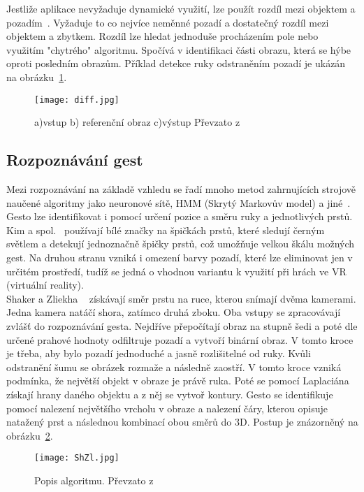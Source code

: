 Jestliže aplikace nevyžaduje dynamické využití, lze použít rozdíl mezi objektem a pozadím~\cite{14}. Vyžaduje to co nejvíce neměnné pozadí a dostatečný rozdíl mezi objektem a zbytkem. Rozdíl lze hledat jednoduše procházením pole nebo využitím "chytrého" algoritmu. Spočívá v identifikaci části obrazu, která se hýbe oproti posledním obrazům. Příklad detekce ruky odstraněním pozadí je ukázán na obrázku~\ref{pic6}.

\begin{figure}[h]
\centering
\texttt{[image: diff.jpg]}
\caption{a)vstup  b) referenční obraz  c)výstup 
Převzato z ~\cite{14} } 
\label{pic6}
\end{figure}


\subsection{Rozpoznávání gest}
Mezi rozpoznávání na základě vzhledu se řadí mnoho metod zahrnujících strojově naučené algoritmy jako neuronové sítě, HMM (Skrytý Markovův model) a jiné~\cite{3}. Gesto lze identifikovat i pomocí určení pozice a směru ruky a jednotlivých prstů.\\ %

Kim a spol.~\cite{5} používají bílé značky na špičkách prstů, které sledují černým světlem a detekují jednoznačně špičky prstů, což umožňuje velkou škálu možných gest. Na druhou stranu vzniká i omezení barvy pozadí, které lze eliminovat jen v určitém prostředí, tudíž se jedná o vhodnou variantu k využití při hrách ve VR (virtuální reality).\\

Shaker a Zliekha ~\cite{12} získávají směr prstu na ruce, kterou snímají dvěma kamerami. Jedna kamera natáčí shora, zatímco druhá zboku. Oba vstupy se zpracovávají zvlášť do rozpoznávání gesta. Nejdříve přepočítají obraz na stupně šedi a poté dle určené prahové hodnoty odfiltruje pozadí a vytvoří binární obraz. V tomto kroce je třeba, aby bylo pozadí jednoduché a jasně rozlišitelné od ruky. Kvůli odstranění šumu se obrázek rozmaže a následně zaostří. V tomto kroce vzniká podmínka, že největší objekt v obraze je právě ruka. Poté se pomocí Laplaciána získají hrany daného objektu a z něj se vytvoř kontury.
Gesto se identifikuje pomocí nalezení největšího vrcholu v obraze a nalezení čáry, kterou opisuje natažený prst a následnou kombinací obou směrů do 3D. Postup je znázorněný na obrázku~\ref{pic7}.
\begin{figure}[h]
\centering
\texttt{[image: ShZl.jpg]}
\caption{Popis algoritmu. Převzato z ~\cite{12} } 
\label{pic7}
\end{figure}

